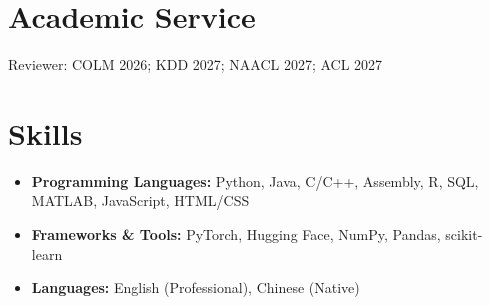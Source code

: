\documentclass[a4paper,10pt]{article}
\begin{document}
\section{Academic Service}
\vspace{-2mm}
Reviewer: COLM 2026; KDD 2027; NAACL 2027; ACL 2027

\section{Skills}
\vspace{-2mm}
\begin{itemize}
  \item \textbf{Programming Languages:} Python, Java, C/C++, Assembly, R, SQL, MATLAB, JavaScript, HTML/CSS
  \item \textbf{Frameworks \& Tools:} PyTorch, Hugging Face, NumPy, Pandas, scikit-learn
  \item \textbf{Languages:} English (Professional), Chinese (Native)
\end{itemize}
\end{document}
